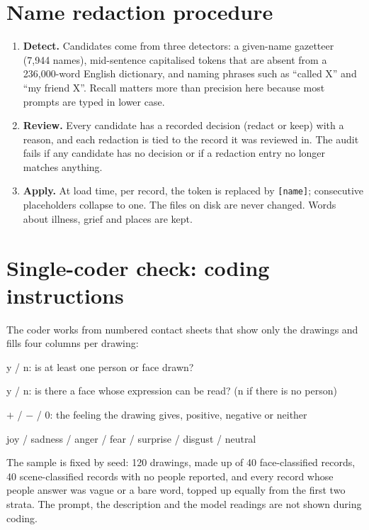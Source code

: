\section{Name redaction procedure}
\begin{enumerate}\setlength{\itemsep}{1pt}
\item \textbf{Detect.} Candidates come from three detectors: a given-name gazetteer (7,944 names), mid-sentence capitalised tokens that are absent from a 236,000-word English dictionary, and naming phrases such as ``called X'' and ``my friend X''. Recall matters more than precision here because most prompts are typed in lower case.
\item \textbf{Review.} Every candidate has a recorded decision (redact or keep) with a reason, and each redaction is tied to the record it was reviewed in. The audit fails if any candidate has no decision or if a redaction entry no longer matches anything.
\item \textbf{Apply.} At load time, per record, the token is replaced by \texttt{[name]}; consecutive placeholders collapse to one. The files on disk are never changed. Words about illness, grief and places are kept.
\end{enumerate}

\section{Single-coder check: coding instructions}
The coder works from numbered contact sheets that show only the drawings and fills four columns per drawing:
\begin{description}\setlength{\itemsep}{1pt}
\item[person] y / n: is at least one person or face drawn?
\item[face] y / n: is there a face whose expression can be read? (n if there is no person)
\item[valence] $+$ / $-$ / 0: the feeling the drawing gives, positive, negative or neither
\item[family] joy / sadness / anger / fear / surprise / disgust / neutral
\end{description}
The sample is fixed by seed: 120 drawings, made up of 40 face-classified records, 40 scene-classified records with no people reported, and every record whose people answer was vague or a bare word, topped up equally from the first two strata. The prompt, the description and the model readings are not shown during coding.
